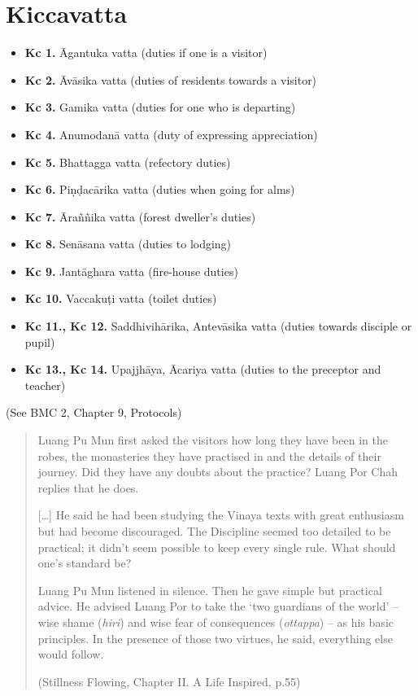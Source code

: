 \chapter{Kiccavatta}

\begin{itemize}
\tightlist
\item
  \textbf{Kc 1.} Āgantuka vatta (duties if one is a visitor)
\item
  \textbf{Kc 2.} Āvāsika vatta (duties of residents towards a visitor)
\item
  \textbf{Kc 3.} Gamika vatta (duties for one who is departing)
\item
  \textbf{Kc 4.} Anumodanā vatta (duty of expressing appreciation)
\item
  \textbf{Kc 5.} Bhattagga vatta (refectory duties)
\item
  \textbf{Kc 6.} Piṇḍacārika vatta (duties when going for alms)
\item
  \textbf{Kc 7.} Āraññika vatta (forest dweller's duties)
\item
  \textbf{Kc 8.} Senāsana vatta (duties to lodging)
\item
  \textbf{Kc 9.} Jantāghara vatta (fire-house duties)
\item
  \textbf{Kc 10.} Vaccakuṭi vatta (toilet duties)
\item
  \textbf{Kc 11., Kc 12.} Saddhivihārika, Antevāsika vatta (duties
  towards disciple or pupil)
\item
  \textbf{Kc 13., Kc 14.} Upajjhāya, Ācariya vatta (duties to the
  preceptor and teacher)
\end{itemize}

(See BMC 2, Chapter 9, Protocols)

\begin{quote}
Luang Pu Mun first asked the visitors how long they have been in the
robes, the monasteries they have practised in and the details of their
journey. Did they have any doubts about the practice? Luang Por Chah
replies that he does.

{[}\ldots{]} He said he had been studying the Vinaya texts with great
enthusiasm but had become discouraged. The Discipline seemed too
detailed to be practical; it didn't seem possible to keep every single
rule. What should one's standard be?

Luang Pu Mun listened in silence. Then he gave simple but practical
advice. He advised Luang Por to take the `two guardians of the world' --
wise shame (\emph{hiri}) and wise fear of consequences (\emph{ottappa})
-- as his basic principles. In the presence of those two virtues, he
said, everything else would follow.

(Stillness Flowing, Chapter II. A Life Inspired, p.55)
\end{quote}

